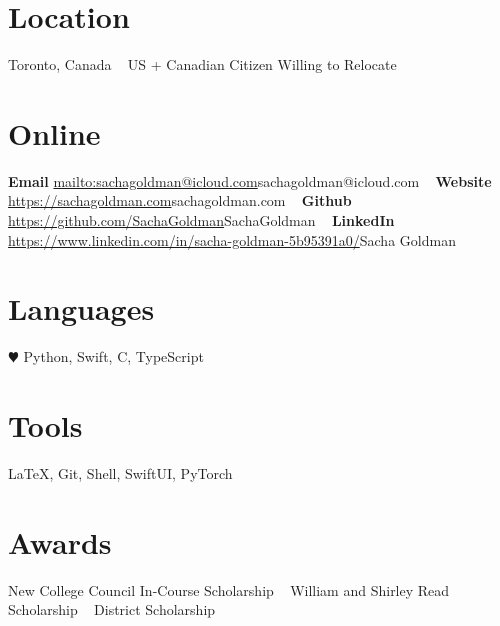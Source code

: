 \documentclass[]{style}
\begin{document}


\begin{aside} %
\section{Location}
Toronto, Canada
~ \vspace{-2mm}
US + Canadian Citizen 
Willing to Relocate
~ \vspace{-2mm}
\section{Online}
\textbf{Email}
\url{mailto:sachagoldman@icloud.com}{sachagoldman@icloud.com} 
~ \vspace{-2mm}
\textbf{Website} 
\url{https://sachagoldman.com}{sachagoldman.com} 
~ \vspace{-2mm}
\textbf{Github}
\url{https://github.com/SachaGoldman}{SachaGoldman}
~ \vspace{-2mm}
\textbf{LinkedIn}
\url{https://www.linkedin.com/in/sacha-goldman-5b95391a0/}{Sacha Goldman}
\section{Languages}
{\color{red} $\varheartsuit$} Python, Swift, 
C, TypeScript
\section{Tools}
\LaTeX, Git, Shell, 
SwiftUI, PyTorch
\section{Awards}
New College Council 
In-Course Scholarship
~ \vspace{-1mm}
William and Shirley Read 
Scholarship
~ \vspace{-1mm}
District Scholarship
\end{aside}

\end{document}
